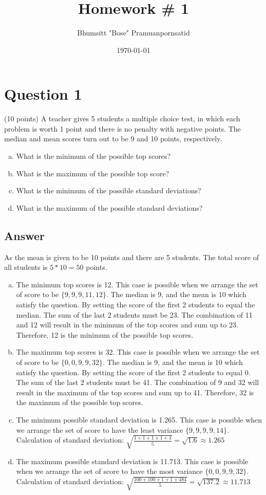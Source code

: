 \documentclass{report}
\title{Homework \# 1}
\author{Bhumsitt "Bose" Pramuanpornsatid}
\date{\today}
\begin{document}
\maketitle

\section*{Question 1}
(10 points) A teacher gives 5 students a multiple choice test, in which each problem is worth 1 point and there is no penalty with negative points. The median and mean scores turn out to be 9 and 10 points, respectively.

\begin{enumerate}[(a)]
    \item What is the minimum of the possible top scores?
    \item What is the maximum of the possible top score?
    \item What is the minimum of the possible standard deviations?
    \item What is the maximum of the possible standard deviations?
\end{enumerate}

\subsection*{Answer}
As the mean is given to be 10 points and there are 5 students. The total score of all students is $5*10=50$ points.
\begin{enumerate}[(a)]
    \item The minimum top scores is 12. This case is possible when we arrange the set of score to be $\{9, 9, 9, 11, 12\}$. The median is 9, and the mean is 10 which satisfy the question. By setting the score of the first 2 students to equal the median. The sum of the last 2 students must be 23. The combination of 11 and 12 will result in the minimum of the top scores and sum up to 23. Therefore, 12 is the minimum of the possible top scores.
    \item The maximum top scores is 32. This case is possible when we arrange the set of score to be $\{0, 0, 9, 9, 32\}$. The median is 9, and the mean is 10 which satisfy the question. By setting the score of the first 2 students to equal 0. The sum of the last 2 students must be 41. The combination of 9 and 32 will result in the maximum of the top scores and sum up to 41. Therefore, 32 is the maximum of the possible top scores.
    \item The minimum possible standard deviation is 1.265. This case is possible when we arrange the set of score to have the least variance $\{9, 9, 9, 9, 14\}$. 
    \newline Calculation of standard deviation: $\sqrt{\frac{1+1+1+1+4}{5}}=\sqrt{1.6}\approx1.265$
    \item The maximum possible standard deviation is 11.713. This case is possible when we arrange the set of score to have the most variance $\{0, 0, 9, 9, 32\}$.
    \newline Calculation of standard deviation: $\sqrt{\frac{100+100+1+1+484}{5}}=\sqrt{137.2}\approx11.713$
\end{enumerate}
\end{document}
